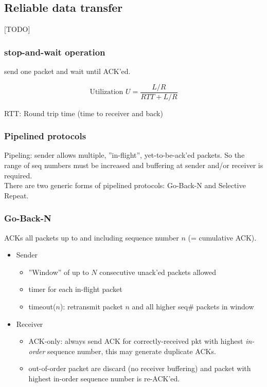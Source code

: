 \documentclass[10pt, a4paper, twocolumn]{scrartcl}
\begin{document}
\subsection{Reliable data transfer}

$[$TODO$]$

\subsubsection{stop-and-wait operation}

send one packet and wait until ACK'ed.

\begin{displaymath}
	\mbox{Utilization } U = \frac{L/R}{RTT+L/R}
\end{displaymath}

RTT: Round trip time (time to receiver and back)

\subsubsection{Pipelined protocols}

Pipeling: sender allows multiple, ''in-flight'', yet-to-be-ack'ed packets. So the range of seq numbers must be increased and buffering at sender and/or receiver is required.\\

There are two generic forms of pipelined protocols: Go-Back-N and Selective Repeat.

\subsubsection{Go-Back-N}

ACKs all packets up to and including sequence number $n$ (= cumulative ACK).

\begin{itemize}
	\item Sender
		\begin{itemize}
			\item ''Window'' of up to $N$ consecutive unack'ed packets allowed
			\item timer for each in-flight packet
			\item timeout($n$): retransmit packet $n$ and all higher seq\# packets in window
		\end{itemize}
	\item Receiver
		\begin{itemize}
			\item ACK-only: always send ACK for correctly-received pkt with highest \textit{in-order} sequence number, this may generate duplicate ACKs.
			\item out-of-order packet are discard (no receiver buffering) and packet with highest in-order sequence number is re-ACK'ed.
		\end{itemize}
\end{itemize}
\end{document}
